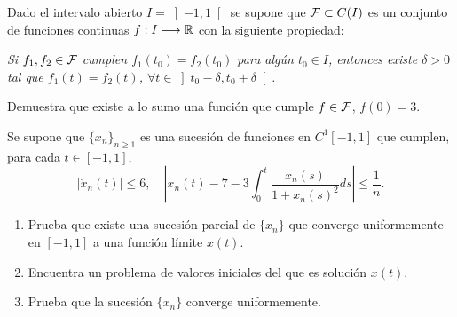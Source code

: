 \documentclass[12pt]{article}
\begin{document}
    \begin{ejercicio}
        Dado el intervalo abierto $I = \left]-1,1\right[$ se supone que $\mathcal{F} \subset C(I)$ es un conjunto de funciones continuas $f : I \longrightarrow \mathbb{R}$ con la siguiente propiedad:
        \begin{center}
            \emph{Si $f_1, f_2 \in \mathcal{F}$ cumplen $f_1(t_0) = f_2(t_0)$ para algún $t_0 \in I$, entonces existe $\delta > 0$ tal que $f_1(t) = f_2(t)$, $\forall t \in \left]t_0 - \delta, t_0 + \delta\right[$.}
        \end{center}

        Demuestra que existe a lo sumo una función que cumple $f \in \mathcal{F}$, $f(0) = 3$.
    \end{ejercicio}

    \begin{ejercicio}
        Se supone que $\{x_n\}_{n \geq 1}$ es una sucesión de funciones en $C^1\left[-1,1\right]$ que cumplen, para cada $t \in \left[-1,1\right]$,
        \[
        |\dot{x}_n(t)| \leq 6, \quad \left|x_n(t) - 7 - 3\int_0^t \frac{x_n(s)}{1+x_n(s)^2} ds\right| \leq \frac{1}{n}.
        \]
        \begin{enumerate}[label=\alph*)]
            \item Prueba que existe una sucesión parcial de $\{x_n\}$ que converge uniformemente en $\left[-1,1\right]$ a una función límite $x(t)$.
            \item Encuentra un problema de valores iniciales del que es solución $x(t)$.
            \item Prueba que la sucesión $\{x_n\}$ converge uniformemente.
        \end{enumerate}
    \end{ejercicio}

    \newpage
    \setcounter{ejercicio}{0} %
    \noindent
\end{document}
